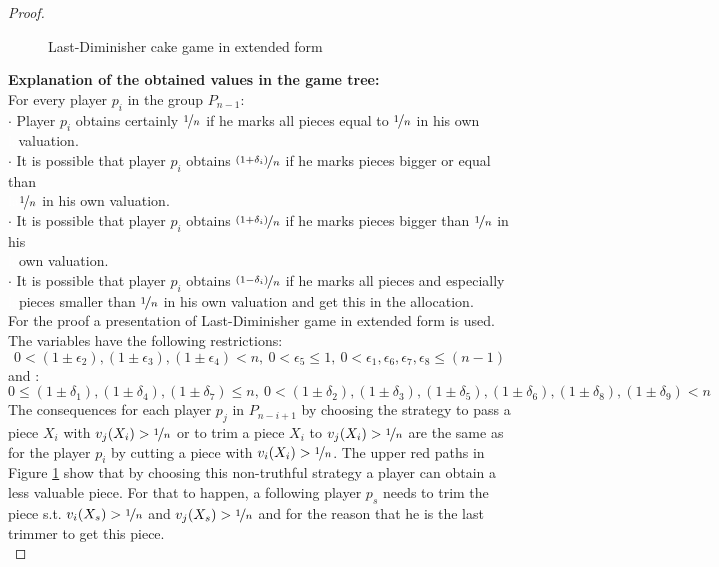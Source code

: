 \begin{proof}
\begin{figure}[h!]
\begin{center}
\begin{tikzpicture}
	\end{tikzpicture}
	\caption{Last-Diminisher cake game in extended form}\label{ldef}
\end{center}
\end{figure}
\newpage
\textbf{Explanation of the obtained values in the game tree:}\\
\newline
For every player $p_i$ in the group $P_{n-1}$:\\
\newline
$\cdot$ Player $p_i$ obtains certainly $\nicefrac{1}{n}$ if he marks all pieces equal to $\nicefrac{1}{n}$ in his own\\\textcolor{white}{la}\textcolor{black}{}valuation.\\
$\cdot$ It is possible that player $p_i$ obtains $\nicefrac{(1+\delta_i)}{n}$ if he marks pieces bigger or equal than\\\textcolor{white}{la}\textcolor{black}{}$\nicefrac{1}{n}$ in his own valuation.\\
$\cdot$ It is possible that player $p_i$ obtains $\nicefrac{(1+\delta_i)}{n}$ if he marks pieces bigger than $\nicefrac{1}{n}$ in his\\\textcolor{white}{la}\textcolor{black}{}own valuation.\\
$\cdot$ It is possible that player $p_i$ obtains $\nicefrac{(1-\delta_i)}{n}$ if he marks all pieces and especially\\\textcolor{white}{la}\textcolor{black}{}pieces smaller than $\nicefrac{1}{n}$ in his own valuation and get this in the allocation.\\
For the proof a presentation of Last-Diminisher game in extended form is used. The variables have the following restrictions: $$ 0 < (1\pm\epsilon_2),(1\pm\epsilon_3),(1\pm\epsilon_4) <n,\: 0 < \epsilon_5 \leq 1,\:0 < \epsilon_1,\epsilon_6,\epsilon_7,\epsilon_8 \leq (n-1)$$ and :$$ 0 \leq (1\pm\delta_1),(1\pm\delta_4),(1\pm\delta_7) \leq n,\:0< (1\pm\delta_2),(1\pm\delta_3),(1\pm\delta_5),(1\pm\delta_6),(1\pm\delta_8),(1\pm\delta_9) < n$$
The consequences for each player $p_j$ in $P_{n-i+1}$ by choosing the strategy to pass a piece $X_i$ with $v_j(X_i)>\nicefrac{1}{n}$ or to trim a piece $X_i$ to $v_j(X_i)>\nicefrac{1}{n}$ are the same as for the player $p_i$ by cutting a piece with $v_i(X_i)>\nicefrac{1}{n}$.
The upper red paths in Figure \ref{ldef} show that by choosing this non-truthful strategy a player can obtain a less valuable piece. For that to happen, a following player $p_s$ needs to trim the piece s.t. $v_i(X_s)>\nicefrac{1}{n}$ and $v_j(X_s)>\nicefrac{1}{n}$ and for the reason that he is the last trimmer to get this piece.\\

\end{proof}
